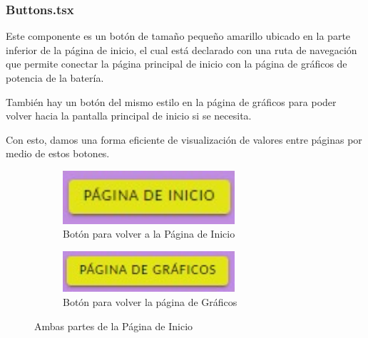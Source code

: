                 \subsubsection{Buttons.tsx}
                    Este componente es un botón de tamaño pequeño amarillo ubicado en la parte inferior de la página de inicio, el cual está declarado con una ruta de navegación que permite conectar la página principal de inicio con la página de gráficos de potencia de la batería.\par 
                    También hay un botón del mismo estilo en la página de gráficos para poder volver hacia la pantalla principal de inicio si se necesita.\par 
                    Con esto, damos una forma eficiente de visualización de valores entre páginas por medio de estos botones.\par

                    \begin{figure}[H]
                        \centering
                        \begin{subfigure}{0.4\textwidth}
                            \centering
                            \includegraphics[width=0.7\textwidth]{Imagenes/Aplicación/Start_Button.jpg}
                            \caption{Botón para volver a la Página de Inicio}
                            \label{fig:a15.1}
                        \end{subfigure}
                        \begin{subfigure}{0.4\textwidth}
                            \centering
                            \includegraphics[width=0.7\textwidth]{Imagenes/Aplicación/Graphics_Button.jpg}
                            \caption{Botón para volver la página de Gráficos}
                            \label{fig:a15.2}
                        \end{subfigure}
                        \hfill
                                
                        \caption{Ambas partes de la Página de Inicio}
                        \label{fig:a20}
                        \end{figure}
                    
